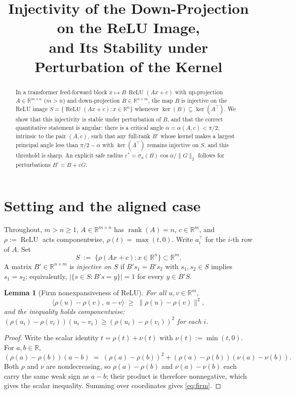 \documentclass[11pt]{article}
\title{Injectivity of the Down-Projection on the ReLU Image,\\ and Its Stability under Perturbation of the Kernel}
\author{}
\date{}
\numberwithin{equation}{section}
\newtheorem{lemma}[theorem]{Lemma}
\theoremstyle{remark}
\newcommand{\R}{\mathbb{R}}
\DeclareMathOperator{\ReLU}{ReLU}
\DeclareMathOperator{\rank}{rank}
\newcommand{\norm}[1]{\lVert #1\rVert}
\newcommand{\ip}[2]{\langle #1,\,#2\rangle}
\begin{document}
\maketitle

\begin{abstract}
\noindent
In a transformer feed-forward block $x\mapsto B\,\ReLU(Ax+c)$ with up-projection $A\in\R^{m\times n}$ ($m>n$) and down-projection $B\in\R^{n\times m}$, the map $B$ is injective on the ReLU image $S=\{\ReLU(Ax+c):x\in\R^n\}$ whenever $\ker(B)\subseteq\ker(A^{\top})$. We show that this injectivity is stable under perturbation of $B$, and that the correct quantitative statement is angular: there is a critical angle $\alpha=\alpha(A,c)<\pi/2$, intrinsic to the pair $(A,c)$, such that any full-rank $B'$ whose kernel makes a largest principal angle less than $\pi/2-\alpha$ with $\ker(A^{\top})$ remains injective on $S$, and this threshold is sharp. An explicit safe radius $\varepsilon^{*}=\sigma_{n}(B)\cos\alpha/\norm{G}_{2}$ follows for perturbations $B'=B+\varepsilon G$.
\end{abstract}

\section{Setting and the aligned case}\label{sec:aligned}

Throughout, $m>n\ge 1$, $A\in\R^{m\times n}$ has $\rank(A)=n$, $c\in\R^m$, and $\rho:=\ReLU$ acts componentwise, $\rho(t)=\max(t,0)$. Write $a_i^{\top}$ for the $i$-th row of $A$. Set
\[
S \;:=\; \{\rho(Ax+c) : x\in\R^n\}\subset\R^m .
\]
A matrix $B'\in\R^{n\times m}$ is \emph{injective on $S$} if $B's_1=B's_2$ with $s_1,s_2\in S$ implies $s_1=s_2$; equivalently, $\bigl|\{s\in S: B's=y\}\bigr|=1$ for every $y\in B'S$.

\begin{lemma}[Firm nonexpansiveness of ReLU]\label{lem:firm}
For all $u,v\in\R^m$,
\begin{equation}\label{eq:firm}
\ip{\rho(u)-\rho(v)}{u-v}\;\ge\;\norm{\rho(u)-\rho(v)}^2,
\end{equation}
and the inequality holds componentwise: $(\rho(u_i)-\rho(v_i))(u_i-v_i)\ge(\rho(u_i)-\rho(v_i))^2$ for each $i$.
\end{lemma}

\begin{proof}
Write the scalar identity $t=\rho(t)+\nu(t)$ with $\nu(t):=\min(t,0)$. For $a,b\in\R$,
\[
(\rho(a)-\rho(b))(a-b)\;=\;(\rho(a)-\rho(b))^2+(\rho(a)-\rho(b))(\nu(a)-\nu(b)).
\]
Both $\rho$ and $\nu$ are nondecreasing, so $\rho(a)-\rho(b)$ and $\nu(a)-\nu(b)$ each carry the same weak sign as $a-b$; their product is therefore nonnegative, which gives the scalar inequality. Summing over coordinates gives \eqref{eq:firm}.
\end{proof}
\end{document}
